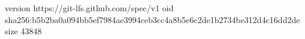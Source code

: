 version https://git-lfs.github.com/spec/v1
oid sha256:b5b2ba0a094bb5ef7984ae3994ceb3cc4a8b5e6c2de1b2734be312d4c16dd2de
size 43848
